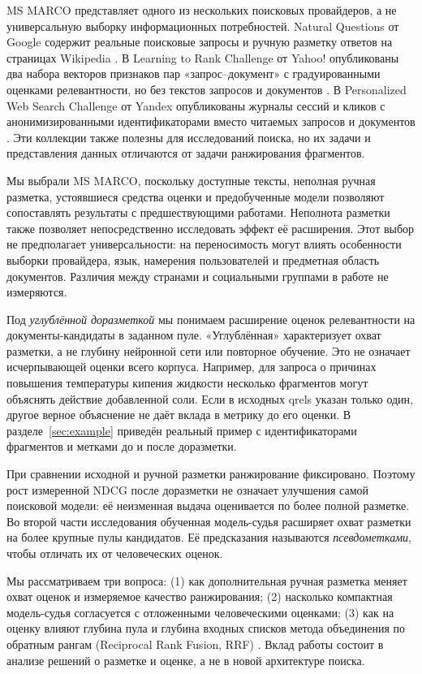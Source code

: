 \documentclass[runningheads,a4paper]{llncs}
\begin{document}
MS MARCO представляет одного из нескольких поисковых провайдеров, а не универсальную выборку информационных потребностей. Natural Questions от Google содержит реальные поисковые запросы и ручную разметку ответов на страницах Wikipedia \cite{kwiatkowski2019naturalquestions}. В Learning to Rank Challenge от Yahoo! опубликованы два набора векторов признаков пар «запрос--документ» с градуированными оценками релевантности, но без текстов запросов и документов \cite{chapelle2011yahoo}. В Personalized Web Search Challenge от Yandex опубликованы журналы сессий и кликов с анонимизированными идентификаторами вместо читаемых запросов и документов \cite{yandex2013personalized}. Эти коллекции также полезны для исследований поиска, но их задачи и представления данных отличаются от задачи ранжирования фрагментов.

Мы выбрали MS MARCO, поскольку доступные тексты, неполная ручная разметка, устоявшиеся средства оценки и предобученные модели позволяют сопоставлять результаты с предшествующими работами. Неполнота разметки также позволяет непосредственно исследовать эффект её расширения. Этот выбор не предполагает универсальности: на переносимость могут влиять особенности выборки провайдера, язык, намерения пользователей и предметная область документов. Различия между странами и социальными группами в работе не измеряются.

Под \emph{углублённой доразметкой} мы понимаем расширение оценок релевантности на документы-кандидаты в заданном пуле. «Углублённая» характеризует охват разметки, а не глубину нейронной сети или повторное обучение. Это не означает исчерпывающей оценки всего корпуса. Например, для запроса о причинах повышения температуры кипения жидкости несколько фрагментов могут объяснять действие добавленной соли. Если в исходных qrels указан только один, другое верное объяснение не даёт вклада в метрику до его оценки. В разделе~\ref{sec:example} приведён реальный пример с идентификаторами фрагментов и метками до и после доразметки.

При сравнении исходной и ручной разметки ранжирование фиксировано. Поэтому рост измеренной NDCG после доразметки не означает улучшения самой поисковой модели: её неизменная выдача оценивается по более полной разметке. Во второй части исследования обученная модель-судья расширяет охват разметки на более крупные пулы кандидатов. Её предсказания называются \emph{псевдометками}, чтобы отличать их от человеческих оценок.

Мы рассматриваем три вопроса: (1) как дополнительная ручная разметка меняет охват оценок и измеряемое качество ранжирования; (2) насколько компактная модель-судья согласуется с отложенными человеческими оценками; (3) как на оценку влияют глубина пула и глубина входных списков метода объединения по обратным рангам (Reciprocal Rank Fusion, RRF) \cite{cormack2009rrf}. Вклад работы состоит в анализе решений о разметке и оценке, а не в новой архитектуре поиска.
\end{document}
